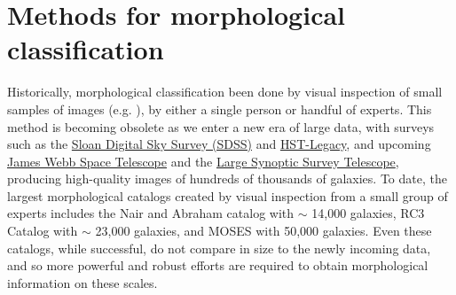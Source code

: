 \section{Methods for morphological classification}

Historically, morphological classification been done by visual inspection of small samples of images (e.g. \citet{Hubble1926,Sandage1961,DeVaucouleurs1963,Block1994,Eskridge2002,Buta2010}), by either a single person or handful of experts. This method is becoming obsolete as we enter a new era of large data, with surveys such as the \href{www.sdss.org}{Sloan Digital Sky Survey (SDSS)} and \href{https://hla.stsci.edu/}{HST-Legacy}, and upcoming \href{https://www.jwst.nasa.gov/}{James Webb Space Telescope} and the \href{https://www.lsst.org/}{Large Synoptic Survey Telescope}, producing high-quality images of hundreds of thousands of galaxies. To date, the largest morphological catalogs created by visual inspection from a small group of experts includes the Nair and Abraham catalog \citep{Nair2010} with $\sim$ 14,000 galaxies, RC3 Catalog \citep{RC31991} with $\sim$ 23,000 galaxies, and MOSES \citep{Schawinski2007} with 50,000 galaxies. Even these catalogs, while successful, do not compare in size to the newly incoming data, and so more powerful and robust efforts are required to obtain morphological information on these scales.


